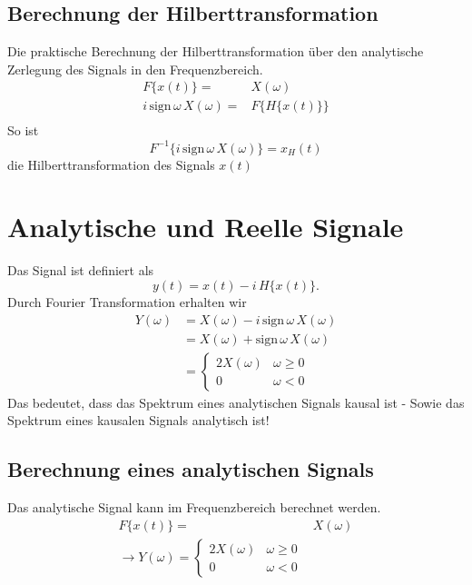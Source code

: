 \subsection*{Berechnung der Hilberttransformation}
Die praktische Berechnung der Hilberttransformation über den analytische Zerlegung des Signals in den Frequenzbereich.
\[
\begin{split}
F\{x(t)\} = & X(\omega)\\
i\,\mbox{sign}\,\omega\,X(\omega) = &F\{H\{x(t)\}\}\\
\end{split}
\]
So ist
\[
F^{-1}\{i\,\mbox{sign}\,\omega\,X(\omega)\} = x_H(t)
\]
die Hilberttransformation des Signals $x(t)$

\section{Analytische und Reelle Signale}
Das Signal ist definiert als
\[
y(t) = x(t) - i\,H\{x(t)\}.
\]
Durch Fourier Transformation erhalten wir
\[
\begin{split}
Y(\omega) & = X(\omega) - i \, \mbox{sign}\,\omega \, X(\omega)\\
& = X(\omega) + \mbox{sign}\,\omega \, X(\omega)\\
& =
\begin{cases}
2 X(\omega) & \omega \geq 0\\
0 & \omega < 0
\end{cases}
\end{split}
\]
Das bedeutet, dass das Spektrum eines analytischen Signals kausal ist - Sowie das Spektrum eines kausalen Signals analytisch ist!

\subsection{Berechnung eines analytischen Signals}
Das analytische Signal kann im Frequenzbereich berechnet werden.
\[
\begin{split}
F\{x(t)\} = & X(\omega)\\
\rightarrow Y(\omega) =
\begin{cases}
2 X(\omega) & \omega \geq 0\\
0 & \omega < 0
\end{cases}
\end{split}
\]

